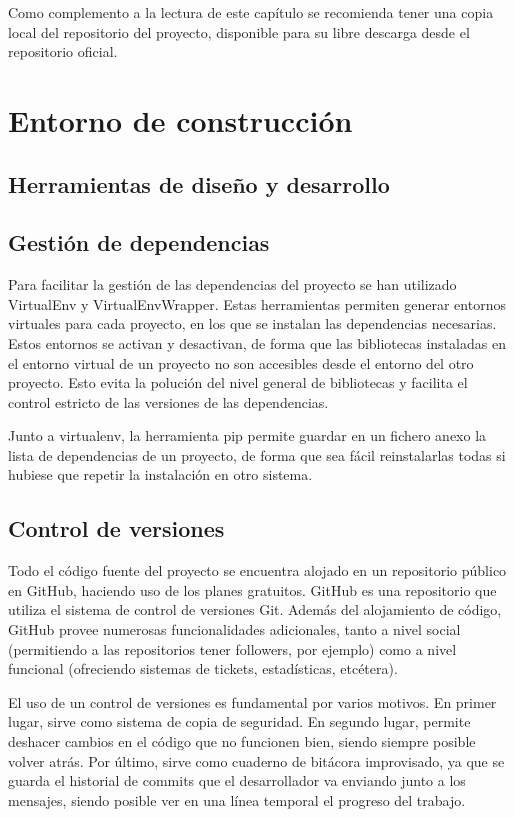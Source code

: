 Como complemento a la lectura de este capítulo se recomienda tener una copia
local del repositorio del proyecto, disponible para su libre descarga desde
el repositorio oficial.

\section{Entorno de construcción}

\subsection{Herramientas de diseño y desarrollo}

\subsection{Gestión de dependencias}

Para facilitar la gestión de las dependencias del proyecto se han utilizado VirtualEnv
y VirtualEnvWrapper. Estas herramientas permiten generar
entornos virtuales para cada proyecto, en los que se instalan las dependencias necesarias.
Estos entornos se activan y desactivan, de forma que las bibliotecas instaladas en
el entorno virtual de un proyecto no son accesibles desde el entorno del
otro proyecto. Esto evita la polución del nivel general de bibliotecas y facilita el
control estricto de las versiones de las dependencias.

Junto a virtualenv, la herramienta pip permite guardar en un fichero anexo
la lista de dependencias de un proyecto, de forma que sea fácil reinstalarlas todas
si hubiese que repetir la instalación en otro sistema.

\subsection{Control de versiones}

Todo el código fuente del proyecto se encuentra alojado en un repositorio público
en GitHub, haciendo uso de los planes gratuitos. GitHub es una repositorio que
utiliza el sistema de control de versiones Git. Además del alojamiento de
código, GitHub provee numerosas funcionalidades adicionales, tanto a nivel
social (permitiendo a las repositorios tener followers, por ejemplo) como a nivel funcional
(ofreciendo sistemas de tickets, estadísticas, etcétera).

El uso de un control de versiones es fundamental por varios motivos. En primer
lugar, sirve como sistema de copia de seguridad. En segundo lugar, permite deshacer
cambios en el código que no funcionen bien, siendo siempre posible volver
atrás. Por último, sirve como cuaderno de bitácora improvisado, ya que se guarda
el historial de commits que el desarrollador va enviando junto a los mensajes,
siendo posible ver en una línea temporal el progreso del trabajo.

